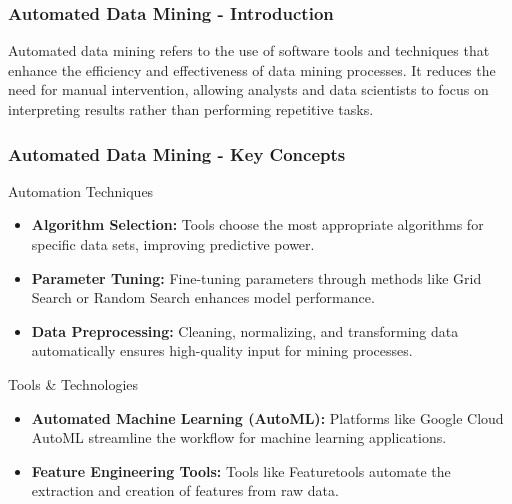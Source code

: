 \documentclass{beamer}
\begin{document}
\begin{frame}[fragile]
    \frametitle{Automated Data Mining - Introduction}
    Automated data mining refers to the use of software tools and techniques that enhance the efficiency and effectiveness of data mining processes. It reduces the need for manual intervention, allowing analysts and data scientists to focus on interpreting results rather than performing repetitive tasks.
\end{frame}

\begin{frame}[fragile]
    \frametitle{Automated Data Mining - Key Concepts}
    \begin{block}{Automation Techniques}
        \begin{itemize}
            \item \textbf{Algorithm Selection:} Tools choose the most appropriate algorithms for specific data sets, improving predictive power.
            \item \textbf{Parameter Tuning:} Fine-tuning parameters through methods like Grid Search or Random Search enhances model performance.
            \item \textbf{Data Preprocessing:} Cleaning, normalizing, and transforming data automatically ensures high-quality input for mining processes.
        \end{itemize}
    \end{block}

    \begin{block}{Tools \& Technologies}
        \begin{itemize}
            \item \textbf{Automated Machine Learning (AutoML):} Platforms like Google Cloud AutoML streamline the workflow for machine learning applications.
            \item \textbf{Feature Engineering Tools:} Tools like Featuretools automate the extraction and creation of features from raw data.
        \end{itemize}
    \end{block}
\end{frame}
\end{document}
